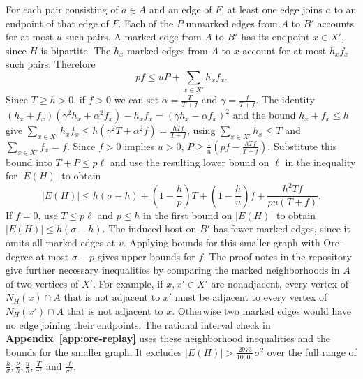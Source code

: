 \documentclass[preprint,11pt,numbers]{elsarticle-arxiv}
\numberwithin{equation}{section}
\theoremstyle{definition}
\begin{document}
For each pair consisting of $a\in A$ and an edge of $F$, at least
one edge joins $a$ to an endpoint of that edge of $F$. Each of the
$P$ unmarked edges from $A$ to $B'$ accounts for at most $u$ such
pairs. A marked edge from $A$ to $B'$ has its endpoint $x\in X'$,
since $H$ is bipartite. The $h_x$ marked edges from $A$ to $x$
account for at most $h_x f_x$ such pairs. Therefore
\[
 pf\leq uP+\sum_{x\in X'} h_xf_x .
\]
Since $T\geq h>0$, if $f>0$ we can set
$\alpha=\frac{T}{T+f}$ and $\gamma=\frac{f}{T+f}$.
The identity
$(h_x+f_x)(\gamma^2h_x+\alpha^2 f_x)-h_x f_x
=(\gamma h_x-\alpha f_x)^2$ and the bound $h_x+f_x\leq h$
give $\sum_{x\in X'} h_xf_x\leq h(\gamma^2T+\alpha^2 f)
=\frac{hTf}{T+f}$, using $\sum_{x\in X'}h_x\leq T$
and $\sum_{x\in X'}f_x=f$. Since $f>0$ implies $u>0$,
$P\geq\frac{1}{u}(pf-\frac{hTf}{T+f})$. Substitute this bound
into $T+P\leq p\ell$ and use the resulting lower bound on $\ell$
in the inequality for $|E(H)|$ to obtain
\[
 |E(H)|\leq h(\sigma-h)+\left(1-\frac hp\right)T
       +\left(1-\frac hu\right)f
       +\frac{h^2Tf}{pu(T+f)} .
\]
If $f=0$, use $T\leq p\ell$ and $p\leq h$ in the first bound
on $|E(H)|$ to obtain $|E(H)|\leq h(\sigma-h)$.
The induced host on $B'$ has fewer marked edges, since it omits
all marked edges at $v$. Applying bounds for this smaller graph with
Ore-degree at most $\sigma-p$ gives upper bounds for $f$.
The proof notes in the repository~\cite{FGSTCode} give further necessary
inequalities by comparing the marked neighborhoods in $A$ of
two vertices of $X'$. For example, if $x,x'\in X'$ are nonadjacent,
every vertex of $N_H(x)\cap A$ that is not adjacent to $x'$ must
be adjacent to every vertex of $N_H(x')\cap A$ that is not adjacent
to $x$. Otherwise two marked edges would have no edge joining their
endpoints. The rational interval check in \textbf{Appendix~\ref{app:ore-replay}}
uses these neighborhood inequalities and the bounds for the smaller
graph. It excludes $|E(H)|>\frac{2973}{10000}\sigma^2$ over the full
range of $\frac{h}{\sigma},\frac ph,\frac uh,\frac{T}{\sigma^2}$
and $\frac{f}{\sigma^2}$.
\end{document}
